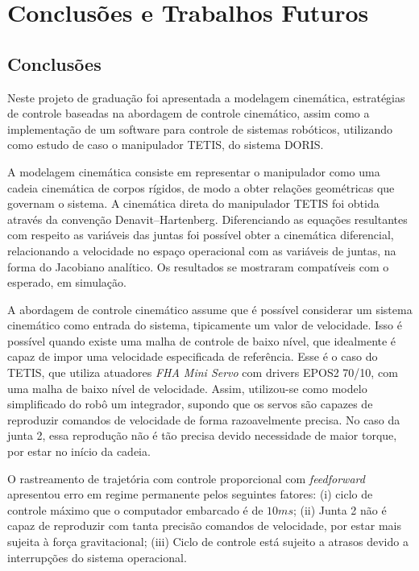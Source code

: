 \chapter{Conclusões e Trabalhos Futuros}

\section{Conclusões}

Neste projeto de graduação foi apresentada a modelagem cinemática, estratégias de controle baseadas na abordagem de controle cinemático, assim como a implementação de um software para controle de sistemas robóticos, utilizando como estudo de caso o manipulador TETIS, do sistema DORIS. 

A modelagem cinemática consiste em representar o manipulador como uma cadeia cinemática de corpos rígidos, de modo a obter relações geométricas que governam o sistema. A cinemática direta do manipulador TETIS foi obtida através da convenção Denavit–Hartenberg. Diferenciando as equações resultantes com respeito as variáveis das juntas foi possível obter a cinemática diferencial, relacionando a velocidade no espaço operacional com as variáveis de juntas, na forma do Jacobiano analítico. Os resultados se mostraram compatíveis com o esperado, em simulação. 

A abordagem de controle cinemático assume que é possível considerar um sistema cinemático como entrada do sistema, tipicamente um valor de velocidade. Isso é possível quando existe uma malha de controle de baixo nível, que idealmente é capaz de impor uma velocidade especificada de referência. Esse é o caso do TETIS, que utiliza atuadores \textit{FHA Mini Servo} com drivers EPOS2 70/10, com uma malha de baixo nível de velocidade. Assim, utilizou-se como modelo simplificado do robô um integrador, supondo que os servos são capazes de reproduzir comandos de velocidade de forma razoavelmente precisa. No caso da junta 2, essa reprodução não é tão precisa devido necessidade de maior torque, por estar no início da cadeia.

O rastreamento de trajetória com controle proporcional com \textit{feedforward} apresentou erro em regime permanente pelos seguintes fatores: (i) ciclo de controle máximo que o computador embarcado é de $10ms$; (ii) Junta 2 não é capaz de reproduzir com tanta precisão comandos de velocidade, por estar mais sujeita à força gravitacional; (iii) Ciclo de controle está sujeito a atrasos devido a interrupções do sistema operacional. 

